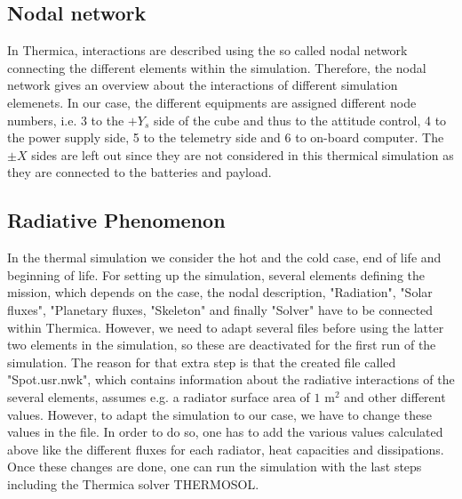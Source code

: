 \subsection{Nodal network}
In Thermica, interactions are described using the so called nodal network connecting the different elements within the simulation. Therefore, the nodal network gives an overview about the interactions of different simulation elemenets. In our case, the different equipments are assigned different node numbers, i.e. 3 to the $+Y_{s}$ side of the cube and thus to the attitude control, 4 to the power supply side,  5 to the telemetry side and 6 to on-board computer. The $\pm X$ sides are left out since they are not considered in this thermical simulation as they are connected to the batteries and payload.

\subsection{Radiative Phenomenon}
In the thermal simulation we consider the hot and the cold case, end of life and beginning of life. For setting up the simulation, several elements defining the mission, which depends on the case, the nodal description, "Radiation", "Solar fluxes", "Planetary fluxes, "Skeleton" and finally "Solver" have to be connected within Thermica. However, we need to adapt several files before using the latter two elements in the simulation, so these are deactivated for the first run of the simulation.  
The reason for that extra step is that the created file called "Spot.usr.nwk", which contains information about the radiative interactions of the several elements, assumes e.g. a radiator surface area of $1$ m$^{2}$ and other different values. However, to adapt the simulation to our case, we have to change these values in the file. In order to do so, one has to add the various values calculated above like the different fluxes for each radiator, heat capacities and dissipations. Once these changes are done, one can run the simulation with the last steps including the Thermica solver THERMOSOL.

